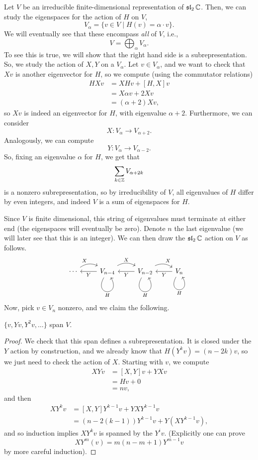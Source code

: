 \documentclass[12pt]{article}
\newcommand{\fsl}{\operatorname{\mathfrak{sl}}}
\begin{document}
Let $V$ be an irreducible finite-dimensional representation of $\fsl_2\C$. Then, we can study the eigenspaces for the action of $H$ on $V$,
\[V_\alpha = \{v\in V \mid H(v) = \alpha\cdot v\}.\]
We will eventually see that these encompass \textit{all} of $V$, i.e.,
\[V = \bigoplus_\alpha V_\alpha.\]
To see this is true, we will show that the right hand side is a subrepresentation. So, we study the action of $X,Y$ on a $V_\alpha$. Let $v\in V_\alpha$, and we want to check that $Xv$ is another eigenvector for $H$, so we compute (using the commutator relations)
\begin{align*}
    HXv &= XHv + [H,X]v\\
    &= X\alpha v + 2Xv\\
    &= (\alpha+2)Xv,
\end{align*}
so $Xv$ is indeed an eigenvector for $H$, with eigenvalue $\alpha+2$. Furthermore, we can consider
\[X: V_\alpha \to V_{\alpha+2}.\]
Analogously, we can compute
\[Y: V_\alpha \to V_{\alpha-2}.\]
So, fixing an eigenvalue $\alpha$ for $H$, we get that
\[\sum_{k\in \mathbb{Z}} V_{\alpha + 2k}\]
is a nonzero subrepresentation, so by irreducibility of $V$, all eigenvalues of $H$ differ by even integers, and indeed $V$ is a sum of eigenspaces for $H$.

Since $V$ is finite dimensional, this string of eigenvalues must terminate at either end (the eigenspaces will eventually be zero). Denote $n$ the last eigenvalue (we will later see that this is an integer). We can then draw the $\fsl_2 \C$ action on $V$ as follows.
\[\begin{tikzcd}
   \cdots \rar["X",bend left] & \lar["Y"] V_{n-4} \ar[out=240,in=300,loop,"H"'] \rar["X", bend left] & \lar["Y"] V_{n-2} \ar[out=240,in=300,loop,"H"'] \rar["X",bend left] & \lar["Y"] V_n \ar[out=240,in=300,loop,"H"']
\end{tikzcd}\]
Now, pick $v\in V_n$ nonzero, and we claim the following.
\begin{prop}
    $\{v,Yv,Y^2v,\dots\}$ span $V$.
\end{prop}
\begin{proof}
    We check that this span defines a subrepresentation. It is closed under the $Y$ action by construction, and we already know that $H(Y^k v) = (n-2k)v$, so we just need to check the action of $X$. Starting with $v$, we compute
    \begin{align*}
        XYv &= [X,Y]v + YXv\\
        &= Hv + 0\\
        &= nv,
    \end{align*}
    and then
    \begin{align*}
        XY^k v &= [X,Y]Y^{k-1}v + YXY^{k-1}v\\
        &= (n-2(k-1))Y^{k-1}v + Y(XY^{k-1}v),
    \end{align*}
    and so induction implies $XY^k v$ is spanned by the $Y^i v$. (Explicitly one can prove
    \[XY^m(v) = m(n-m+1)Y^{m-1}v\]
    by more careful induction).
\end{proof}
\end{document}
